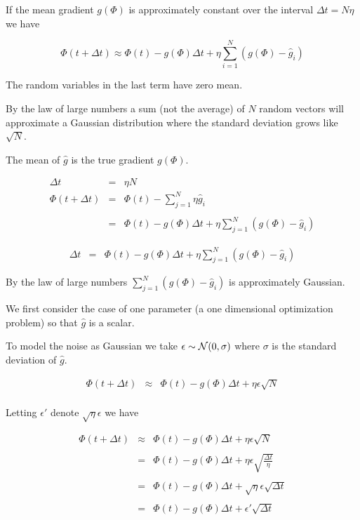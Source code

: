 {If the mean gradient $g(\Phi)$ is approximately constant over the interval $\Delta t = N \eta$ we have

$$\Phi(t + \Delta t)  \approx \Phi(t) -g(\Phi)\Delta t + \eta \sum_{i=1}^N (g(\Phi) - \hat{g}_i)$$

\vfill
The random variables in the last term have zero mean.

\vfill
By the law of large numbers a sum (not the average) of $N$ random vectors will approximate a Gaussian distribution where the standard deviation
grows like $\sqrt{N}$.


The mean of $\hat{g}$ is the true gradient $g(\Phi)$.  

\begin{eqnarray*}
\Delta t & = & \eta N \\
\Phi(t + \Delta t) &  = & \Phi(t) - \sum_{j=1}^N \eta\hat{g}_i \\
\\
 &  = & \Phi(t) -g(\Phi)\Delta t + \eta \sum_{j=1}^N (g(\Phi) - \hat{g}_i)
\end{eqnarray*}


\begin{eqnarray*}
\Delta t & = &  \Phi(t) -g(\Phi)\Delta t + \eta \sum_{j=1}^N (g(\Phi) - \hat{g}_i)
\end{eqnarray*}


\vfill
By the law of large numbers $\sum_{j=1}^N (g(\Phi) - \hat{g}_i)$ is approximately Gaussian.


We first consider the case of one parameter (a one dimensional optimization problem) so that $\hat{g}$ is a scalar.

\vfill
To model the noise as Gaussian we take $\epsilon \sim {\cal N}(0,\sigma)$ where $\sigma$ is the standard deviation of $\hat{g}$.

\begin{eqnarray*}
\Phi(t + \Delta t) & \approx & \Phi(t) -g(\Phi)\Delta t + \eta \epsilon \sqrt{N} \\
\end{eqnarray*}



Letting $\epsilon'$ denote $\sqrt{\eta}\epsilon$ we have

\vfill
\begin{eqnarray*}
\Phi(t + \Delta t) & \approx & \Phi(t) -g(\Phi)\Delta t +  \eta \epsilon \sqrt{N} \\
\\
& = & \Phi(t) -g(\Phi)\Delta t +  \eta \epsilon \sqrt{\frac{\Delta t}{\eta}} \\
\\
& = & \Phi(t) -g(\Phi)\Delta t +  \sqrt{\eta} \epsilon \sqrt{\Delta t} \\
\\
& = & \Phi(t) -g(\Phi)\Delta t +  \epsilon' \sqrt{\Delta t} \\
\end{eqnarray*}

}
